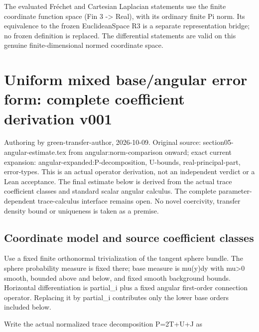 \documentclass[11pt]{article}
\theoremstyle{definition}
\theoremstyle{remark}
\numberwithin{equation}{section}
\begin{document}
The evaluated Fréchet and Cartesian Laplacian statements use the finite
coordinate function space (Fin 3 -\textgreater{} Real), with its
ordinary finite Pi norm. Its equivalence to the frozen EuclideanSpace R3
is a separate representation bridge; no frozen definition is replaced.
The differential statements are valid on this genuine finite-dimensional
normed coordinate space.

\clearpage
\hypertarget{source-71285ede3265-uniform-mixed-baseangular-error-form-complete-coefficient-derivation-v001}{%
\section{Uniform mixed base/angular error form: complete coefficient
derivation
v001}\label{source-71285ede3265-uniform-mixed-baseangular-error-form-complete-coefficient-derivation-v001}}

Authoring by green-transfer-author, 2026-10-09. Original source:
section05-angular-estimate.tex from angular:norm-comparison onward;
exact current expansion: angular-expanded:P-decomposition, U-bounds,
real-principal-part, error-types. This is an actual operator derivation,
not an independent verdict or a Lean acceptance. The final estimate
below is derived from the actual trace coefficient classes and standard
scalar angular calculus. The complete parameter-dependent trace-calculus
interface remains open. No novel coercivity, transfer density bound or
uniqueness is taken as a premise.

\hypertarget{source-71285ede3265-coordinate-model-and-source-coefficient-classes}{%
\subsection{Coordinate model and source coefficient
classes}\label{source-71285ede3265-coordinate-model-and-source-coefficient-classes}}

Use a fixed finite orthonormal trivialization of the tangent sphere
bundle. The sphere probability measure is fixed there; base measure is
mu(y)dy with mu\textgreater0 smooth, bounded above and below, and fixed
smooth background bounds. Horizontal differentiation is partial\_i plus
a fixed angular first-order connection operator. Replacing it by
partial\_i contributes only the lower base orders included below.

Write the actual normalized trace decomposition P=2T+U+J as
\end{document}
